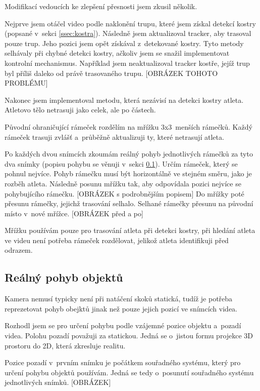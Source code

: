 Modifikací vedoucích ke zlepšení přesnosti jsem zkusil několik.

Nejprve jsem otáčel video podle naklonění trupu, které jsem získal detekcí kostry (popsané v~sekci \ref{ssec:kostra}). Následně jsem aktualizoval tracker, aby trasoval pouze trup. Jeho pozici jsem opět získával z~detekované kostry. Tyto metody selhávaly při chybné detekci kostry, ačkoliv jsem se snažil implementovat kontrolní mechanismus. Například jsem neaktualizoval tracker kostře, jejíž trup byl příliš daleko od právě trasovaného trupu. [OBRÁZEK TOHOTO PROBLÉMU]

Nakonec jsem implementoval metodu, která nezávisí na detekci kostry atleta. Atletovo tělo netrasuji jako celek, ale po částech.

Původní ohraničující rámeček rozdělím na mřížku 3x3~menších rámečků. Každý rámeček trasuji zvlášť a~průběžně aktualizuji ty, které netrasují atleta.

Po každých dvou snímcích zkoumám reálný pohyb jednotlivých rámečků za tyto dva snímky (popisu pohybu se věnuji v~sekci \ref{ssec:pohyb}). Určím rámeček, který se pohnul nejvíce. Pohyb rámečku musí být horizontálně ve stejném směru, jako je rozběh atleta. Následně posunu mřížku tak, aby odpovídala pozici nejvíce se pohybujícího rámečku. [OBRÁZEK s podrobnějším popisem] Do mřížky poté přesunu rámečky, jejichž trasování selhalo. Selhané rámečky přesunu na původní místo v~nové mřížce. [OBRÁZEK před a po]

Mřížku používám pouze pro trasování atleta při detekci kostry, při hledání atleta ve videu není potřeba rámeček rozdělovat, jelikož atleta identifikuji před odrazem.

\subsection{Reálný pohyb objektů}
\label{ssec:pohyb}

Kamera nemusí typicky není při natáčení skoků statická, tudíž je potřeba reprezetovat pohyb obejktů jinak než pouze jejich pozicí ve snímcích videa.

Rozhodl jsem se pro určení pohybu podle vzájemné pozice objektu a~pozadí videa. Polohu pozadí považuji za statickou. Jedná se o~jistou formu projekce 3D prostoru do 2D, která zkresluje realitu.

Pozice pozadí v~prvním snímku je počátkem souřadného systému, který pro určení pohybu objektů používám. Jedná se tedy o~posunutí souřadného systému jednotlivých snímků. [OBRÁZEK]

